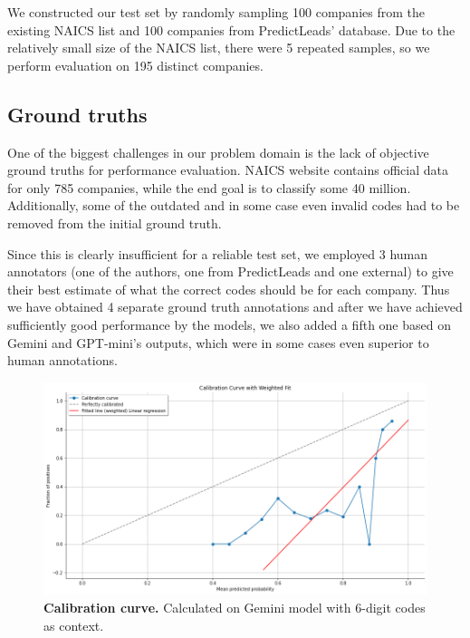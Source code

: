 \documentclass[fleqn,moreauthors,10pt]{ds_report}
\begin{document}
We constructed our test set by randomly sampling 100 companies from the existing NAICS list and 100 companies from PredictLeads' database. Due to the relatively small size of the NAICS list, there were 5 repeated samples, so we perform evaluation on 195 distinct companies. 

\subsection*{Ground truths}

One of the biggest challenges in our problem domain is the lack of objective ground truths for performance evaluation. NAICS website contains official data for only 785 companies, while the end goal is to classify some 40 million. Additionally, some of the outdated and in some case even invalid codes had to be removed from the initial ground truth. 

Since this is clearly insufficient for a reliable test set, we employed 3 human annotators (one of the authors, one from PredictLeads and one external) to give their best estimate of what the correct codes should be for each company. Thus we have obtained 4 separate ground truth annotations and after we have achieved sufficiently good performance by the models, we also added a fifth one based on Gemini and GPT-mini's outputs, which were in some cases even superior to human annotations. 


\begin{figure}[ht]\centering
	\includegraphics[width=\linewidth]{calibration.png}
	\caption{\textbf{Calibration curve.} Calculated on Gemini model with 6-digit codes as context.}
	\label{fig:column}
\end{figure}


\end{document}
